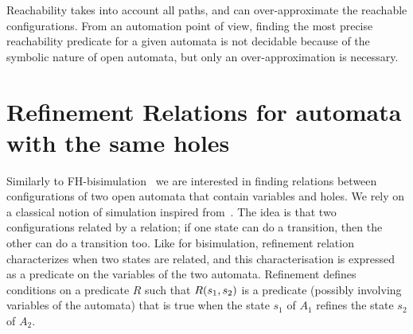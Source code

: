 \documentclass[runningheads]{llncs}
\begin{document}
Reachability takes into account all paths, and can over-approximate the reachable configurations. 
From an automation point of view, finding the most precise reachability predicate for a given automata is not decidable because of the symbolic nature of open automata, but only an over-approximation is necessary.


\section{Refinement Relations for automata with the same holes}\label{sec:refinement}

Similarly to FH-bisimulation~\cite{fhbisim} we are interested  in finding relations between configurations of two open automata that contain variables and holes. 
We rely on a classical notion of simulation inspired from~\cite{fhbisim}. The idea is that two configurations related by a relation; if one state can do a transition, then the other can do a transition too. 
Like for bisimulation, refinement relation characterizes when two states are related, and this  characterisation is expressed as a predicate on the variables of the two automata.
Refinement defines conditions on a predicate $R$ such that $R{\left(s_1, s_2\right)}$ is a predicate (possibly involving variables of the automata) that is true when the state $s_1$ of $A_1$ refines the state $s_2$ of $A_2$.



%
\end{document}
